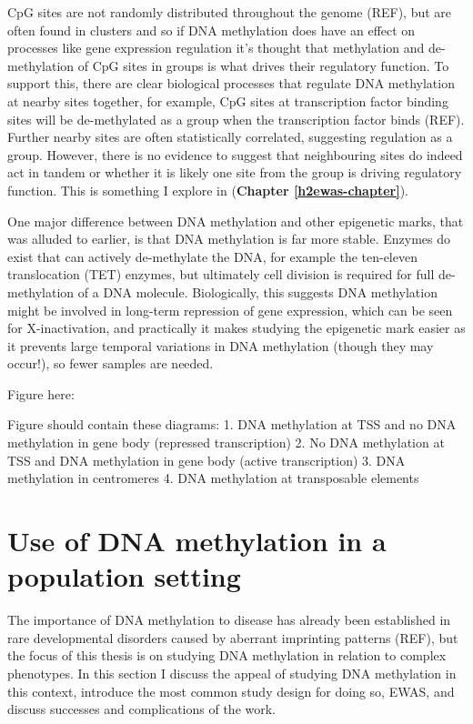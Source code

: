 \documentclass[11pt,twoside]{bristolthesis}
\begin{document}
CpG sites are not randomly distributed throughout the genome (REF), but are often found in clusters and so if DNA methylation does have an effect on processes like gene expression regulation it's thought that methylation and de-methylation of CpG sites in groups is what drives their regulatory function. To support this, there are clear biological processes that regulate DNA methylation at nearby sites together, for example, CpG sites at transcription factor binding sites will be de-methylated as a group when the transcription factor binds (REF). Further nearby sites are often statistically correlated, suggesting regulation as a group. However, there is no evidence to suggest that neighbouring sites do indeed act in tandem or whether it is likely one site from the group is driving regulatory function. This is something I explore in (\textbf{Chapter \ref{h2ewas-chapter}}).

One major difference between DNA methylation and other epigenetic marks, that was alluded to earlier, is that DNA methylation is far more stable. Enzymes do exist that can actively de-methylate the DNA, for example the ten-eleven translocation (TET) enzymes, but ultimately cell division is required for full de-methylation of a DNA molecule. Biologically, this suggests DNA methylation might be involved in long-term repression of gene expression, which can be seen for X-inactivation, and practically it makes studying the epigenetic mark easier as it prevents large temporal variations in DNA methylation (though they may occur!), so fewer samples are needed.

Figure here:

Figure should contain these diagrams:
1. DNA methylation at TSS and no DNA methylation in gene body (repressed transcription)
2. No DNA methylation at TSS and DNA methylation in gene body (active transcription)
3. DNA methylation in centromeres
4. DNA methylation at transposable elements

\hypertarget{dnam-phs}{%
\section{Use of DNA methylation in a population setting~}\label{dnam-phs}}

The importance of DNA methylation to disease has already been established in rare developmental disorders caused by aberrant imprinting patterns (REF), but the focus of this thesis is on studying DNA methylation in relation to complex phenotypes. In this section I discuss the appeal of studying DNA methylation in this context, introduce the most common study design for doing so, EWAS, and discuss successes and complications of the work.
\end{document}
